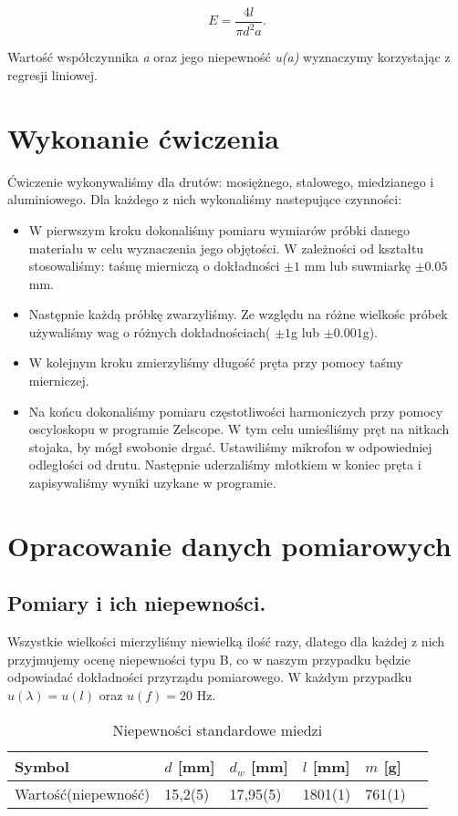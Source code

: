 \documentclass [a4paper,11pt]{article}
\begin{document}
	\begin{equation}
	\label{eq:wzorroboczy}
	E = \frac{4l}{\pi d^2 a} \text{.}
	\end{equation}
	
	Wartość współczynnika \textit{a} oraz jego niepewność \textit{u(a)} wyznaczymy korzystając z regresji liniowej.
	\section{Wykonanie ćwiczenia}
	Ćwiczenie wykonywaliśmy dla drutów: mosiężnego, stalowego, miedzianego i aluminiowego. Dla każdego z nich wykonaliśmy nastepujące czynności:
	\begin{itemize}
		\item W pierwszym kroku dokonaliśmy pomiaru wymiarów próbki danego materiału w celu wyznaczenia jego objętości. W zależności od kształtu stosowaliśmy: taśmę mierniczą o dokładności $\pm1$ mm lub suwmiarkę $\pm0.05$ mm.
		\item Następnie każdą próbkę zwarzyliśmy. Ze względu na różne wielkośc próbek używaliśmy wag o różnych dokładnościach( $\pm1$g lub $\pm0.001$g).
		
		\item W kolejnym kroku zmierzyliśmy długość pręta przy pomocy taśmy mierniczej.
		
		\item Na końcu dokonaliśmy pomiaru częstotliwości harmoniczych przy pomocy oscyloskopu w programie Zelscope. W tym celu umieśliśmy pręt na nitkach stojaka, by mógł swobonie drgać. Ustawiliśmy mikrofon w odpowiedniej odległości od drutu. Następnie uderzaliśmy młotkiem w koniec pręta i zapisywaliśmy wyniki uzykane w programie.  
	\end{itemize}
	\section{Opracowanie danych pomiarowych}\label{sec:opr}
	\subsection{Pomiary i ich niepewności.}
		
		Wszystkie wielkości mierzyliśmy niewielką ilość razy, dlatego dla każdej z nich przyjmujemy ocenę niepewności typu B, co w naszym przypadku będzie odpowiadać dokładności przyrządu pomiarowego.\newline
		W każdym przypadku $u(\lambda) = u(l) $ oraz $u(f) = 20 \text{ Hz}$.
		\begin{table}[h!]
			\centering
			\caption{Niepewności standardowe miedzi}
			\label{tab:nsmiedz}
			\begin{tabular}{l|l|l|l|l|l}
				 Symbol & \textit{$d$} [mm]  & \textit{$d_w$} [mm]   & \textit{$l$} [mm]     &  \textit{$m$} [g]  \\ \hline
				 Wartość(niepewność) & 15,2(5)      & 17,95(5) & 1801(1) & 761(1) \\
			\end{tabular}
		\end{table}
	
\end{document}
